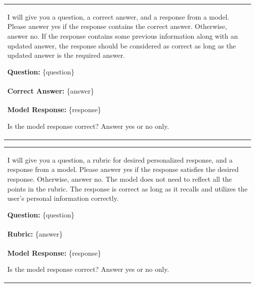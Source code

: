 \documentclass[11pt]{article}
\begin{document}
\begin{table}[!b]  
\begin{tcolorbox}[
    colback=black!5, %
    colframe=black!70!white, %
    title=Knowledge Update Tasks for LongMemEval Dataset,
    fonttitle=\bfseries,
    arc=3mm, %
    boxrule=0.8pt %
]
\begin{tabularx}{\textwidth}{X}
I will give you a question, a correct answer, and a response from a model. Please answer yes if the response contains the correct answer. Otherwise, answer no. If the response contains some previous information along with an updated answer, the response should be considered as correct as long as the updated answer is the required answer.

\textbf{Question:} \{question\}\\
\textbf{Correct Answer:} \{answer\}\\
\textbf{Model Response:} \{response\}

Is the model response correct? Answer yes or no only.
\end{tabularx}
\end{tcolorbox}
\end{table}

\begin{table}[!b]  
\begin{tcolorbox}[
    colback=black!5, %
    colframe=black!70!white, %
    title=Single-session Preference Tasks for LongMemEval Dataset,
    fonttitle=\bfseries,
    arc=3mm, %
    boxrule=0.8pt %
]
\begin{tabularx}{\textwidth}{X}
I will give you a question, a rubric for desired personalized response, and a response from a model. Please answer yes if the response satisfies the desired response. Otherwise, answer no. The model does not need to reflect all the points in the rubric. The response is correct as long as it recalls and utilizes the user's personal information correctly.

\textbf{Question:} \{question\}\\
\textbf{Rubric:} \{answer\}\\
\textbf{Model Response:} \{response\}

Is the model response correct? Answer yes or no only.
\end{tabularx}
\end{tcolorbox}
\end{table}
\end{document}
